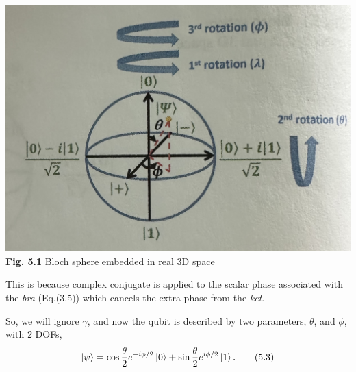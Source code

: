 \documentclass{article}
\begin{document}
\begin{center}
    \includegraphics[scale=0.3]{Fig.5.2.jpeg}\\
\textbf{Fig. 5.1} Bloch sphere embedded in real 3D space
\end{center}
This is because complex conjugate is applied to the scalar phase associated
with the \textit{bra} (Eq.(3.5)) which cancels the extra phase from the \textit{ket}.

So, we will ignore $\gamma$, and now the qubit is described by two parameters, $\theta$, and $\phi$, with 
2 DOFs,
\begin{equation} \label{eq 5.3}
    \ket{\psi}=\cos{\frac{\theta}{2}}e^{-i\phi/2}\ket{0}+\sin{\frac{\theta}{2}}e^{i\phi/2}\ket{1}. \tag{5.3}
\end{equation}
\end{document}
